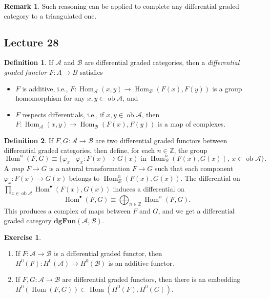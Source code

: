\documentclass[10pt,letterpaper,cm]{nupset}
\theoremstyle{definition}
\newtheorem*{definition}{Definition}
\newtheorem{remark}{Remark}
\newtheorem{exercise}{Exercise}
\newcommand{\Z}{\mathbb Z}
\newcommand{\1}{\mathbf{1}}
\renewcommand{\a}{\mathscr{A}}
\renewcommand{\b}{\mathscr{B}}
\newcommand{\0}{\vec 0}
\DeclareMathOperator{\ob}{ob}
\DeclareMathOperator{\Hom}{Hom}
\begin{document}
\begin{remark}
Such reasoning can be applied to complete any differential graded category to a triangulated one.
\end{remark}

\subsection{Lecture 28}

\begin{definition}
If $\a$ and $\b$ are differential graded categories, then a \textit{differential graded functor $F: A \to B$} satisfies
\begin{itemize}
\item $F$ is additive, i.e., $F : \Hom_{\a}(x,y) \to \Hom_{\b}(F(x), F(y))$ is a group homomorphism for any $x,y \in \ob{\a}$, and
\item $F$ respects differentials, i.e., if $x,y \in \ob{\a}$, then $F : \Hom_{\a}(x,y) \to \Hom_{\b}(F(x), F(y))$ is a map of complexes.
\end{itemize}
\end{definition}

\begin{definition}
If $F, G : \a \to \b$ are two differential graded functors between differential graded categories, then define, for each $n \in \Z$, the group $$\Hom^n(F, G) \equiv \{\varphi_x \mid \varphi_x : F(x) \to G(x) \text{ in } \Hom_{\b}^n(F(x), G(x)), \ x \in \ob{\a} \}.$$ A \textit{map $F \to G$} is a natural transformation $F\to G$ such that each component $\varphi_x: F(x) \to G(x)$ belongs to $\Hom^n_{\b}(F(x), G(x))$. The differential on $\prod_{x \in \ob{\a}} \Hom^{\bullet}(F(x), G(x))$ induces a differential on $$\Hom^{\bullet}(F, G) \equiv \bigoplus_{n \in \Z}\Hom^n(F,G).$$ This produces a complex of maps between $F$ and $G$, and we get a differential graded category $\mathbf{dgFun}(\a, \b)$.
\end{definition}

\begin{exercise} $ $
\begin{enumerate}
\item If $F : \a \to \b$ is a differential graded functor, then $H^0(F) : H^0(\a) \to H^0(\b)$ is an additive functor.
\item If $F, G : \a \to \b$ are differential graded functors, then there is an embedding $H^0(\Hom(F, G)) \subset \Hom(H^0(F), H^0(G))$.
\end{enumerate}
\end{exercise}
\end{document}
